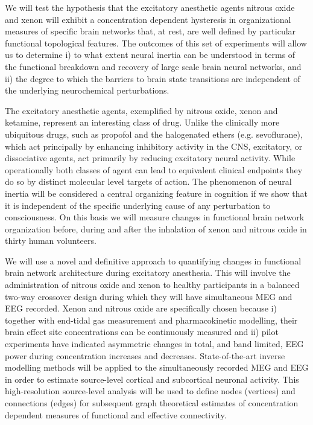 \documentclass{article}
\begin{document}
We will test the hypothesis that the excitatory anesthetic agents nitrous oxide and xenon  will exhibit a concentration dependent hysteresis in organizational measures of specific brain networks that, at rest, are well defined by particular functional topological features. The outcomes of this set of experiments will allow us to determine i) to what extent neural inertia can be understood  in terms of the functional breakdown and recovery of large scale brain neural networks, and ii) the degree to which the barriers to brain state transitions are independent of the underlying neurochemical perturbations.

The excitatory anesthetic agents, exemplified by nitrous oxide, xenon and ketamine, represent  an interesting class of drug. Unlike the clinically more ubiquitous drugs, such as propofol and the halogenated ethers (e.g. sevoflurane), which act principally by enhancing inhibitory activity in the CNS, excitatory, or dissociative agents, act primarily by reducing excitatory neural activity. While operationally both classes of agent can lead to equivalent clinical endpoints they do so by distinct molecular level targets of action. The phenomenon of  neural inertia will be considered a central organizing feature in cognition if we show that it is independent of the specific underlying cause of any perturbation to consciousness. On this basis we will measure changes in functional brain network organization before, during and after the inhalation  of xenon and nitrous oxide in thirty human volunteers.

We will use a novel and definitive approach to quantifying changes in functional brain network  architecture during excitatory anesthesia. This will involve the administration of nitrous oxide and xenon to healthy participants in a balanced two-way crossover design during which they will have simultaneous MEG and EEG recorded. Xenon and nitrous oxide are specifically chosen because i)  together with end-tidal gas measurement and pharmacokinetic modelling, their brain effect site concentrations can be continuously measured and ii) pilot experiments have indicated asymmetric changes in total, and band limited, EEG power during concentration increases and decreases. State-of-the-art inverse modelling methods will be applied to the simultaneously recorded MEG and EEG in order to estimate source-level cortical and subcortical  neuronal activity. This high-resolution source-level analysis will be used to define nodes (vertices) and connections (edges) for subsequent graph theoretical estimates of concentration dependent measures of functional and effective connectivity. 
\end{document}
